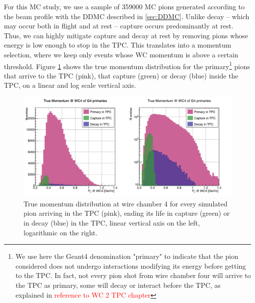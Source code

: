 For this MC study, we use a sample of 359000 MC pions generated according to the beam profile with the DDMC described in \ref{sec:DDMC}. Unlike decay -- which may occur both in flight and at rest -- capture occurs predominantly
at rest. Thus, we can highly mitigate capture and decay at rest by removing pions whose energy is low enough to stop in the TPC. This translates into a momentum selection, where we keep only events whose WC momentum is above a certain threshold. 
Figure \ref{fig:CaptureMom} shows the true momentum distribution for the primary\footnote{We use here the Geant4 denomination "primary" to indicate that the pion considered does not undergo interactions modifying its energy before getting to the TPC. In fact, not every pion shot from wire chamber four will arrive to the TPC as primary,  some will decay or interact before the TPC, as explained in \textcolor{red}{reference to WC 2 TPC chapter}} pions that arrive to the TPC (pink), that capture (green) or decay (blue) inside the TPC, on a linear and log scale vertical axis. 

\begin{figure}[hpbt]
\centering
\includegraphics[width=15cm]{Chapter-7/Images/CDAsMomentumFunct.png}
\caption{True momentum distribution at wire chamber 4 for every simulated pion arriving in the TPC (pink), ending its life in capture (green) or in decay (blue) in the TPC, linear vertical axis on the left, logarithmic on the right. }
\label{fig:CaptureMom}
\end{figure}


